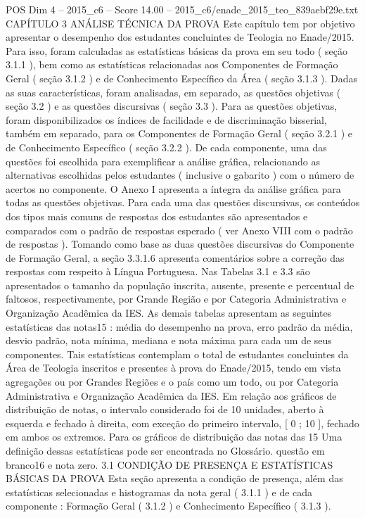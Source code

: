 \begin{textsample}{POS Dim 4 – 2015\_c6 – Score 14.00 – 2015\_c6/enade\_2015\_teo\_839aebf29e.txt}  \label{ex:f4_pos_021}
CAPÍTULO 3 ANÁLISE TÉCNICA DA PROVA Este capítulo tem por objetivo apresentar o desempenho dos estudantes concluintes de Teologia no Enade/2015.
Para isso, foram calculadas as estatísticas básicas da prova em seu todo ( seção 3.1.1 ), bem como as estatísticas relacionadas aos Componentes de Formação Geral ( seção 3.1.2 ) e de Conhecimento Específico da Área ( seção 3.1.3 ).
Dadas as suas características, foram analisadas, em separado, as questões objetivas ( seção 3.2 ) e as questões discursivas ( seção 3.3 ).
Para as questões objetivas, foram disponibilizados os índices de facilidade e de discriminação bisserial, também em separado, para os Componentes de Formação Geral ( seção 3.2.1 ) e de Conhecimento Específico ( seção 3.2.2 ).
De cada componente, uma das questões foi escolhida para exemplificar a análise gráfica, relacionando as alternativas escolhidas pelos estudantes ( inclusive o gabarito ) com o número de acertos no componente.
O Anexo I apresenta a íntegra da análise gráfica para todas as questões objetivas.
Para cada uma das questões discursivas, os conteúdos dos tipos mais comuns de respostas dos estudantes são apresentados e comparados com o padrão de respostas esperado ( ver Anexo VIII com o padrão de respostas ).
Tomando como base as duas questões discursivas do Componente de Formação Geral, a seção 3.3.1.6 apresenta comentários sobre a correção das respostas com respeito à Língua Portuguesa.
Nas Tabelas 3.1 e 3.3 são apresentados o tamanho da população inscrita, ausente, presente e percentual de faltosos, respectivamente, por Grande Região e por Categoria Administrativa e Organização Acadêmica da IES.
As demais tabelas apresentam as seguintes estatísticas das notas15 : média do desempenho na prova, erro padrão da média, desvio padrão, nota mínima, mediana e nota máxima para cada um de seus componentes.
Tais estatísticas contemplam o total de estudantes concluintes da Área de Teologia inscritos e presentes à prova do Enade/2015, tendo em vista agregações ou por Grandes Regiões e o país como um todo, ou por Categoria Administrativa e Organização Acadêmica da IES.
Em relação aos gráficos de distribuição de notas, o intervalo considerado foi de 10 unidades, aberto à esquerda e fechado à direita, com exceção do primeiro intervalo, [ 0 ; 10 ], fechado em ambos os extremos.
Para os gráficos de distribuição das notas das 15 Uma definição dessas estatísticas pode ser encontrada no Glossário. questão em branco16 e nota zero. 3.1 CONDIÇÃO DE PRESENÇA E ESTATÍSTICAS BÁSICAS DA PROVA Esta seção apresenta a condição de presença, além das estatísticas selecionadas e histogramas da nota geral ( 3.1.1 ) e de cada componente : Formação Geral ( 3.1.2 ) e Conhecimento Específico ( 3.1.3 ).

\end{textsample}
